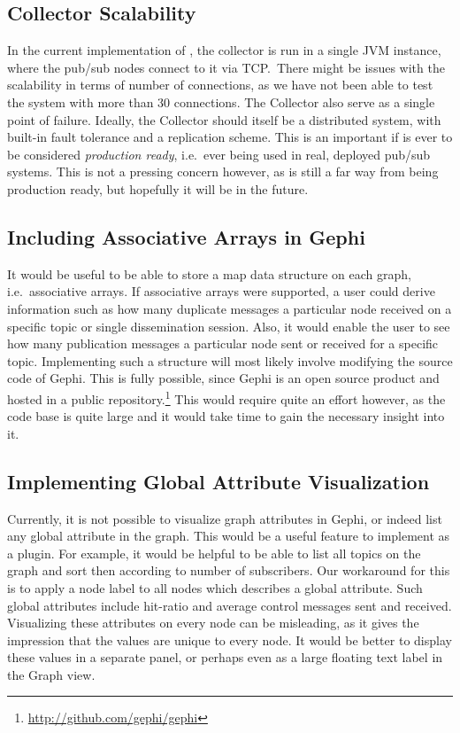 \subsection{Collector Scalability}

In the current implementation of \demo{}, the collector is run in a
single JVM instance, where the pub/sub nodes connect to it via TCP.\
There might be issues with the scalability in terms of number of
connections, as we have not been able to test the system with more than
30 connections. The Collector also serve as a single point of failure.
Ideally, the Collector should itself be a distributed system, with
built-in fault tolerance and a replication scheme. This is an important
if \demo{} is ever to be considered \emph{production ready}, i.e.\ ever
being used in real, deployed pub/sub systems. This is not a pressing
concern however, as \demo{} is still a far way from being production
ready, but hopefully it will be in the future.

\subsection{Including Associative Arrays in Gephi}

It would be useful to be able to store a map data structure on each
graph, i.e.\ associative arrays. If associative arrays were supported,
a user could derive information such as how many duplicate messages a
particular node received on a specific topic or single dissemination
session. Also, it would enable the user to see how many publication messages a
particular node sent or received for a specific topic. Implementing such
a structure will most likely involve modifying the source code of Gephi.
This is fully possible, since Gephi is an open source product and hosted
in a public repository.\footnote{\url{http://github.com/gephi/gephi}}
This would require quite an effort however, as the code base is quite
large and it would take time to gain the necessary insight into it.

\subsection{Implementing Global Attribute Visualization}

Currently, it is not possible to visualize graph attributes in Gephi, or
indeed list any global attribute in the graph. This would be a useful
feature to implement as a plugin. For example, it would be helpful to be
able to list all topics on the graph and sort then according to number
of subscribers. Our workaround for this is to apply a node label to all
nodes which describes a global attribute. Such global attributes include
hit-ratio and average control messages sent and received. Visualizing
these attributes on every node can be misleading, as it gives the
impression that the values are unique to every node. It would be better
to display these values in a separate panel, or perhaps even as a large
floating text label in the Graph view.

